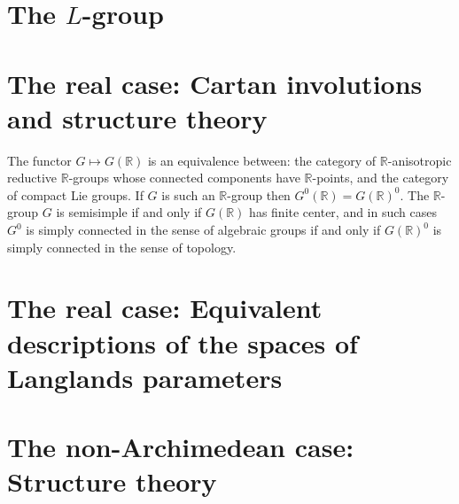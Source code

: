 \section{The $L$-group}


\section{The real case: Cartan involutions and structure theory}


\begin{theorem}
\label{theorem-functor-compactgroups}
 The functor $G\mapsto G(\mathbb R)$ is an equivalence between: the category of $\mathbb R$-anisotropic reductive $\mathbb R$-groups whose connected components have $\mathbb R$-points, and the category of compact Lie groups. If $G$ is such an $\mathbb R$-group then $G^0(\mathbb R)=G(\mathbb R)^0$. The $\mathbb R$-group $G$ is semisimple if and only if $G(\mathbb R)$ has finite center, and in such cases $G^0$ is simply connected in the sense of algebraic groups if and only if $G(\mathbb R)^0$ is simply connected in the sense of topology.
\end{theorem}




\section{The real case: Equivalent descriptions of the spaces of Langlands parameters}


\section{The non-Archimedean case: Structure theory}




















